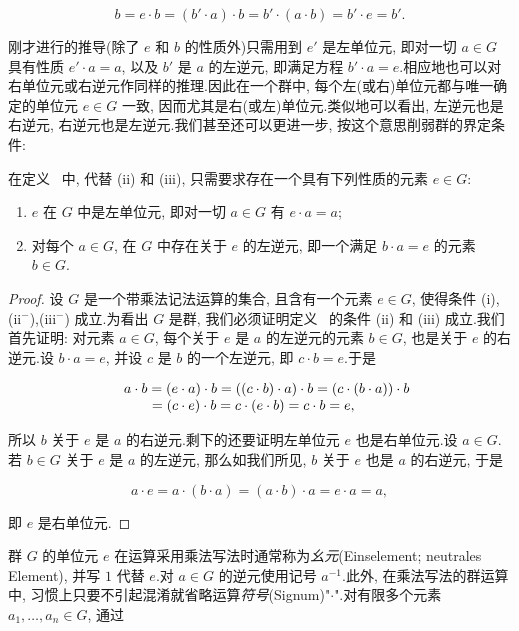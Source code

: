 \[
b = e \cdot b = (b' \cdot a) \cdot b = b' \cdot (a \cdot b) = b' \cdot e = b'.
\]

刚才进行的推导(除了 $e$ 和 $b$ 的性质外)只需用到 $e'$ 是左单位元, 即对一切 $a \in G$ 具有性质 $e' \cdot a = a$, 以及 $b'$ 是 $a$ 的左逆元, 即满足方程 $b' \cdot a = e$.相应地也可以对右单位元或右逆元作同样的推理.因此在一个群中, 每个左(或右)单位元都与唯一确定的单位元 $e \in G$ 一致, 因而尤其是右(或左)单位元.类似地可以看出, 左逆元也是右逆元, 右逆元也是左逆元.我们甚至还可以更进一步, 按这个意思削弱群的界定条件:

\begin{remark}[群的界定条件的削弱]\label{rem:1.2.2}
在定义~ 中, 代替 (ii) 和 (iii), 只需要求存在一个具有下列性质的元素 $e \in G$:
\begin{enumerate}
\item[(ii$^-$)] $e$ 在 $G$ 中是左单位元, 即对一切 $a \in G$ 有 $e \cdot a = a$;
\item[(iii$^-$)] 对每个 $a \in G$, 在 $G$ 中存在关于 $e$ 的左逆元, 即一个满足 $b \cdot a = e$ 的元素 $b \in G$.
\end{enumerate}
\end{remark}

\begin{proof}
设 $G$ 是一个带乘法记法运算的集合, 且含有一个元素 $e \in G$, 使得条件 (i),(ii$^-$),(iii$^-$) 成立.为看出 $G$ 是群, 我们必须证明定义~ 的条件 (ii) 和 (iii) 成立.我们首先证明: 对元素 $a \in G$, 每个关于 $e$ 是 $a$ 的左逆元的元素 $b \in G$, 也是关于 $e$ 的右逆元.设 $b \cdot a = e$, 并设 $c$ 是 $b$ 的一个左逆元, 即 $c \cdot b = e$.于是

\[
\begin{array}{r l}
& a \cdot b = (e \cdot a) \cdot b = ((c \cdot b) \cdot a) \cdot b = (c \cdot (b \cdot a)) \cdot b \\
& \qquad = (c \cdot e) \cdot b = c \cdot (e \cdot b) = c \cdot b = e,
\end{array}
\]

所以 $b$ 关于 $e$ 是 $a$ 的右逆元.剩下的还要证明左单位元 $e$ 也是右单位元.设 $a \in G$.若 $b \in G$ 关于 $e$ 是 $a$ 的左逆元, 那么如我们所见, $b$ 关于 $e$ 也是 $a$ 的右逆元, 于是

\[
a \cdot e = a \cdot (b \cdot a) = (a \cdot b) \cdot a = e \cdot a = a,
\]

即 $e$ 是右单位元.
\end{proof}

群 $G$ 的单位元 $e$ 在运算采用乘法写法时通常称为\emph{幺元}(\textup{Einselement; neutrales Element}), 并写 $1$ 代替 $e$.对 $a \in G$ 的逆元使用记号 $a^{-1}$.此外, 在乘法写法的群运算中, 习惯上只要不引起混淆就省略运算\emph{符号}(\textup{Signum})"$\cdot$".对有限多个元素 $a_1, \ldots, a_n \in G$, 通过

